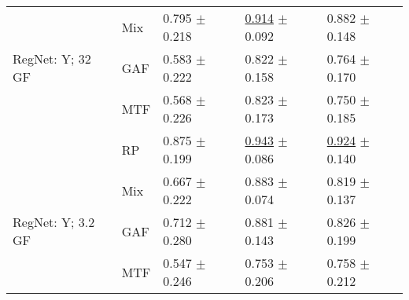\begin{tabular}[t]{lllll}
 & Mix & \textcolor[rgb]{0.2352941176,0.5000000000,0}{0.795} $\pm$ \textcolor[rgb]{0.7808184292,0.2191815708,0}{0.218} & \underline{\textcolor[rgb]{0.1354581673,0.5000000000,0}{0.914}} $\pm$ \textcolor[rgb]{0.1734181887,0.5000000000,0}{0.092} & \textcolor[rgb]{0.2729057592,0.5000000000,0}{0.882} $\pm$ \textcolor[rgb]{0.2337917794,0.5000000000,0}{0.148} \\
RegNet: Y; 32 GF & GAF & \textcolor[rgb]{0.6470588235,0.3529411765,0}{0.583} $\pm$ \textcolor[rgb]{0.7931155389,0.2068844611,0}{0.222} & \textcolor[rgb]{0.4435590969,0.5000000000,0}{0.822} $\pm$ \textcolor[rgb]{0.5423669416,0.4576330584,0}{0.158} & \textcolor[rgb]{0.6400523560,0.3599476440,0}{0.764} $\pm$ \textcolor[rgb]{0.3377261871,0.5000000000,0}{0.170} \\
 & MTF & \textcolor[rgb]{0.6764705882,0.3235294118,0}{0.568} $\pm$ \textcolor[rgb]{0.8082238591,0.1917761409,0}{0.226} & \textcolor[rgb]{0.4409030544,0.5000000000,0}{0.823} $\pm$ \textcolor[rgb]{0.6253561540,0.3746438460,0}{0.173} & \textcolor[rgb]{0.6832460733,0.3167539267,0}{0.750} $\pm$ \textcolor[rgb]{0.4100739638,0.5000000000,0}{0.185} \\
 & RP & \textcolor[rgb]{0.0808823529,0.5000000000,0}{0.875} $\pm$ \textcolor[rgb]{0.7127864450,0.2872135550,0}{0.199} & \underline{\textcolor[rgb]{0.0398406375,0.5000000000,0}{0.943}} $\pm$ \textcolor[rgb]{0.1408376023,0.5000000000,0}{0.086} & \underline{\textcolor[rgb]{0.1433246073,0.5000000000,0}{0.924}} $\pm$ \textcolor[rgb]{0.1910808871,0.5000000000,0}{0.140} \\
 & Mix & \textcolor[rgb]{0.4852941176,0.5000000000,0}{0.667} $\pm$ \textcolor[rgb]{0.7931155389,0.2068844611,0}{0.222} & \textcolor[rgb]{0.2390438247,0.5000000000,0}{0.883} $\pm$ \textcolor[rgb]{0.0705412324,0.5000000000,0}{0.074} & \textcolor[rgb]{0.4672774869,0.5000000000,0}{0.819} $\pm$ \textcolor[rgb]{0.1771731194,0.5000000000,0}{0.137} \\
RegNet: Y; 3.2 GF & GAF & \textcolor[rgb]{0.3970588235,0.5000000000,0}{0.712} $\pm$ \textcolor[rgb]{1.0000000000,0.0000000000,0}{0.280} & \textcolor[rgb]{0.2470119522,0.5000000000,0}{0.881} $\pm$ \textcolor[rgb]{0.4576134518,0.5000000000,0}{0.143} & \textcolor[rgb]{0.4456806283,0.5000000000,0}{0.826} $\pm$ \textcolor[rgb]{0.4815370304,0.5000000000,0}{0.199} \\
 & MTF & \textcolor[rgb]{0.7176470588,0.2823529412,0}{0.547} $\pm$ \textcolor[rgb]{0.8782313605,0.1217686395,0}{0.246} & \textcolor[rgb]{0.6758420862,0.3241579138,0}{0.753} $\pm$ \textcolor[rgb]{0.8086742020,0.1913257980,0}{0.206} & \textcolor[rgb]{0.6596858639,0.3403141361,0}{0.758} $\pm$ \textcolor[rgb]{0.5449560239,0.4550439761,0}{0.212} \\

\end{tabular}
